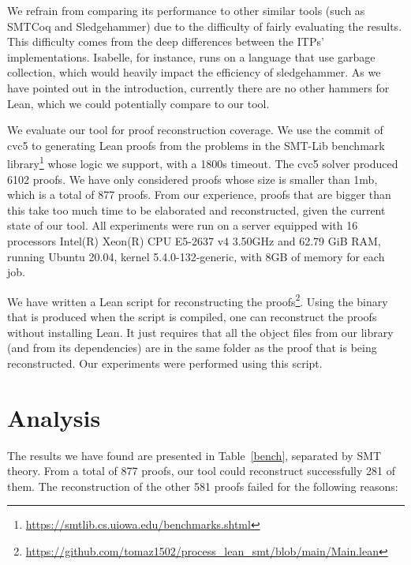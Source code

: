 We refrain from comparing its performance to other similar tools (such as
SMTCoq and Sledgehammer) due to the difficulty of fairly evaluating
the results. This difficulty comes from the deep differences between the ITPs'
implementations. Isabelle, for instance, runs on a language that use
garbage collection, which would heavily impact the efficiency of
sledgehammer. As we have pointed out in the introduction, currently
there are no other hammers for Lean, which we could potentially compare
to our tool.

We evaluate our tool for proof reconstruction coverage.
We use the commit
 of cvc5 to generating Lean proofs from the
problems in the SMT-Lib benchmark library\footnote{\url{https://smtlib.cs.uiowa.edu/benchmarks.shtml}} whose
logic we support, with a 1800s timeout. The cvc5 solver produced 6102
proofs. We have only considered proofs whose size is smaller than
1mb, which is a total of 877 proofs. From our experience, proofs that are
bigger than this take too much time to be elaborated and reconstructed,
given the current state of our tool.
All experiments were run on a server
equipped with 16 processors Intel(R) Xeon(R) CPU E5-2637 v4 3.50GHz and
62.79 GiB RAM, running Ubuntu 20.04, kernel 5.4.0-132-generic, with 8GB of memory for each job.

We have written a Lean script for reconstructing the proofs\footnote{\url{https://github.com/tomaz1502/process_lean_smt/blob/main/Main.lean}}. Using the binary that is produced when the script is compiled, one can reconstruct the proofs without installing Lean.
It just requires that all the object files from our library (and from its dependencies) are in the same folder as the proof that is being reconstructed.
Our experiments were performed using this script.

\section{Analysis}

The results we have found are presented in Table~\ref{bench}, separated
by SMT theory. From a total of 877 proofs, our tool could reconstruct
successfully 281 of them. The reconstruction of the other 581 proofs
failed for the following reasons:

